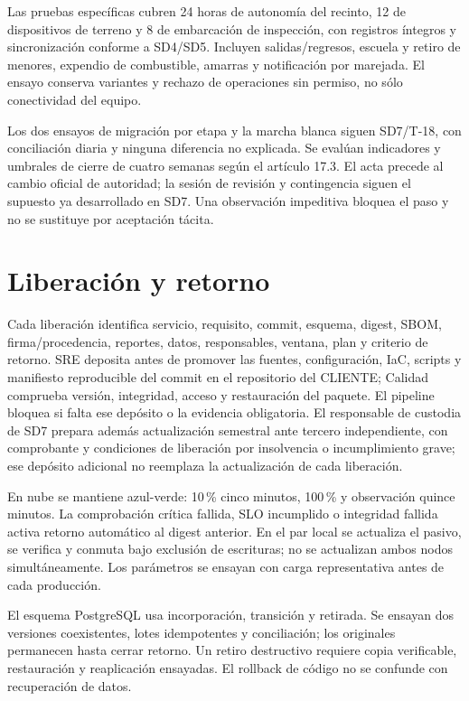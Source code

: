 Las pruebas específicas cubren 24 horas de autonomía del recinto, 12 de dispositivos de terreno y 8 de embarcación de inspección, con registros íntegros y sincronización conforme a SD4/SD5. Incluyen salidas/regresos, escuela y retiro de menores, expendio de combustible, amarras y notificación por marejada. El ensayo conserva variantes y rechazo de operaciones sin permiso, no sólo conectividad del equipo. \parencite[cap.~15, RT-03.10, p.~33]{sd6-c07}

Los dos ensayos de migración por etapa y la marcha blanca siguen SD7/T-18, con conciliación diaria y ninguna diferencia no explicada. Se evalúan indicadores y umbrales de cierre de cuatro semanas según el artículo 17.3. El acta precede al cambio oficial de autoridad; la sesión de revisión y contingencia siguen el supuesto ya desarrollado en SD7. Una observación impeditiva bloquea el paso y no se sustituye por aceptación tácita. \parencites[art.~17.3, pp.~12--13]{sd6-ba}[RT-20.02--04, p.~35]{sd6-bt}

\section{Liberación y retorno}
Cada liberación identifica servicio, requisito, commit, esquema, digest, SBOM, firma/procedencia, reportes, datos, responsables, ventana, plan y criterio de retorno. SRE deposita antes de promover las fuentes, configuración, IaC, scripts y manifiesto reproducible del commit en el repositorio del CLIENTE; Calidad comprueba versión, integridad, acceso y restauración del paquete. El pipeline bloquea si falta ese depósito o la evidencia obligatoria. El responsable de custodia de SD7 prepara además actualización semestral ante tercero independiente, con comprobante y condiciones de liberación por insolvencia o incumplimiento grave; ese depósito adicional no reemplaza la actualización de cada liberación. \parencite[art.~84.1/6, p.~43]{sd6-ba}

En nube se mantiene azul-verde: 10\,\% cinco minutos, 100\,\% y observación quince minutos. La comprobación crítica fallida, SLO incumplido o integridad fallida activa retorno automático al digest anterior. En el par local se actualiza el pasivo, se verifica y conmuta bajo exclusión de escrituras; no se actualizan ambos nodos simultáneamente. Los parámetros se ensayan con carga representativa antes de cada producción. \parencite[RT-04.06/07, p.~11]{sd6-bt}

El esquema PostgreSQL usa incorporación, transición y retirada. Se ensayan dos versiones coexistentes, lotes idempotentes y conciliación; los originales permanecen hasta cerrar retorno. Un retiro destructivo requiere copia verificable, restauración y reaplicación ensayadas. El rollback de código no se confunde con recuperación de datos. \parencite[RT-04.10, p.~11]{sd6-bt}

